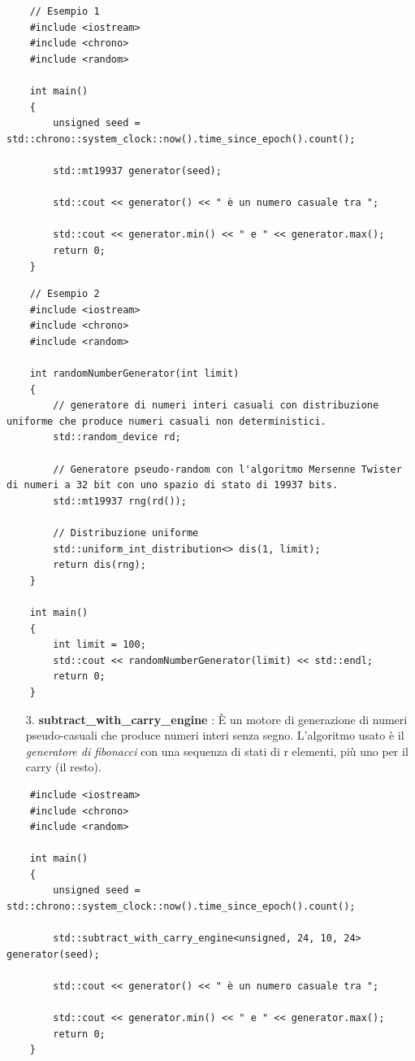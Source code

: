 \begin{lstlisting}
	// Esempio 1
	#include <iostream>
	#include <chrono>
	#include <random>
	
	int main()
	{
		unsigned seed = std::chrono::system_clock::now().time_since_epoch().count();
		
		std::mt19937 generator(seed);
		
		std::cout << generator() << " è un numero casuale tra ";
		
		std::cout << generator.min() << " e " << generator.max();
		return 0;
	}
\end{lstlisting}

\begin{lstlisting}
	// Esempio 2
	#include <iostream>
	#include <chrono>
	#include <random>
	
	int randomNumberGenerator(int limit)
	{
		// generatore di numeri interi casuali con distribuzione uniforme che produce numeri casuali non deterministici.
		std::random_device rd;
		
		// Generatore pseudo-random con l'algoritmo Mersenne Twister di numeri a 32 bit con uno spazio di stato di 19937 bits.
		std::mt19937 rng(rd());
		
		// Distribuzione uniforme
		std::uniform_int_distribution<> dis(1, limit);
		return dis(rng);
	}
	
	int main()
	{
		int limit = 100;
		std::cout << randomNumberGenerator(limit) << std::endl;
		return 0;
	}
\end{lstlisting}

\begin{enumerate}
	\item[3.] \textsf{\small \textbf{subtract\_with\_carry\_engine} : È un motore di generazione di numeri pseudo-casuali che produce numeri interi senza segno. L'algoritmo usato è il \emph{generatore di fibonacci} con una sequenza di stati di r elementi, più uno per il carry (il resto).} \\
\end{enumerate}

\begin{lstlisting}
	#include <iostream>
	#include <chrono>
	#include <random>
	
	int main()
	{
		unsigned seed = std::chrono::system_clock::now().time_since_epoch().count();
		
		std::subtract_with_carry_engine<unsigned, 24, 10, 24> generator(seed);
		
		std::cout << generator() << " è un numero casuale tra ";
		
		std::cout << generator.min() << " e " << generator.max();
		return 0;
	}
\end{lstlisting}


